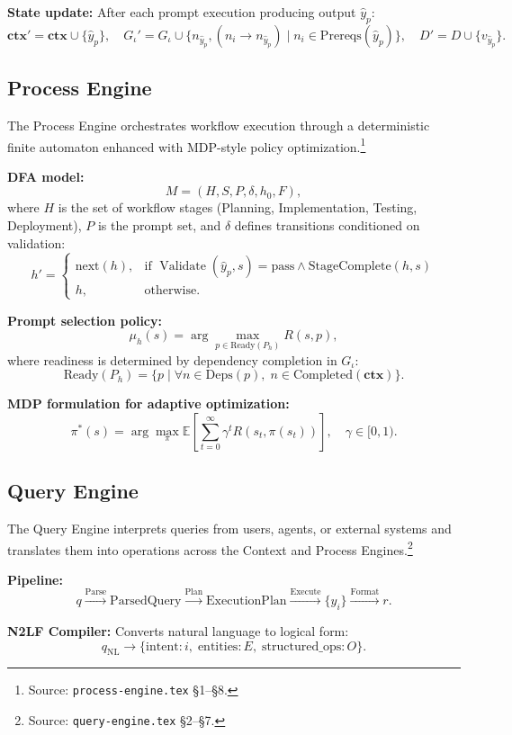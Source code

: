 \documentclass[11pt]{article}
\theoremstyle{remark}
\DeclareMathOperator{\Execute}{Execute}
\DeclareMathOperator{\Validate}{Validate}
\DeclareMathOperator{\Plan}{Plan}
\DeclareMathOperator{\Parse}{Parse}
\DeclareMathOperator{\Format}{Format}
\newcommand{\ctx}{\mathbf{ctx}}
\newcommand{\yp}{\hat{y}_p}
\begin{document}
\textbf{State update:} After each prompt execution producing output $\yp$:
\[
\ctx' = \ctx \cup \{\yp\}, \quad G_\iota' = G_\iota \cup \{n_{\yp}, (n_i \to n_{\yp}) \mid n_i \in \mathrm{Prereqs}(\yp)\}, \quad D' = D \cup \{v_{\yp}\}.
\]

\subsection{Process Engine}
\label{subsec:process}

The Process Engine orchestrates workflow execution through a deterministic finite automaton enhanced with MDP-style policy optimization.\footnote{Source: \texttt{process-engine.tex} \S1--\S8.}

\textbf{DFA model:}
\[
M = (H, S, P, \delta, h_0, F),
\]
where $H$ is the set of workflow stages (Planning, Implementation, Testing, Deployment), $P$ is the prompt set, and $\delta$ defines transitions conditioned on validation:
\[
h' = \begin{cases}
\mathrm{next}(h), & \text{if } \Validate(\yp, s) = \mathrm{pass} \wedge \mathrm{StageComplete}(h, s) \\
h, & \text{otherwise.}
\end{cases}
\]

\textbf{Prompt selection policy:}
\[
\mu_h(s) = \arg\max_{p \in \mathrm{Ready}(P_h)} R(s, p),
\]
where readiness is determined by dependency completion in $G_\iota$:
\[
\mathrm{Ready}(P_h) = \{p \mid \forall n \in \mathrm{Deps}(p),\; n \in \mathrm{Completed}(\ctx)\}.
\]

\textbf{MDP formulation for adaptive optimization:}
\[
\pi^*(s) = \arg\max_\pi \mathbb{E}\left[\sum_{t=0}^\infty \gamma^t R(s_t, \pi(s_t))\right], \quad \gamma \in [0, 1).
\]

\subsection{Query Engine}
\label{subsec:query}

The Query Engine interprets queries from users, agents, or external systems and translates them into operations across the Context and Process Engines.\footnote{Source: \texttt{query-engine.tex} \S2--\S7.}

\textbf{Pipeline:}
\[
q \xrightarrow{\Parse} \mathrm{ParsedQuery} \xrightarrow{\Plan} \mathrm{ExecutionPlan} \xrightarrow{\Execute} \{y_i\} \xrightarrow{\Format} r.
\]

\textbf{N2LF Compiler:} Converts natural language to logical form:
\[
q_{\mathrm{NL}} \to \{\mathrm{intent}: i,\; \mathrm{entities}: E,\; \mathrm{structured\_ops}: O\}.
\]
\end{document}
